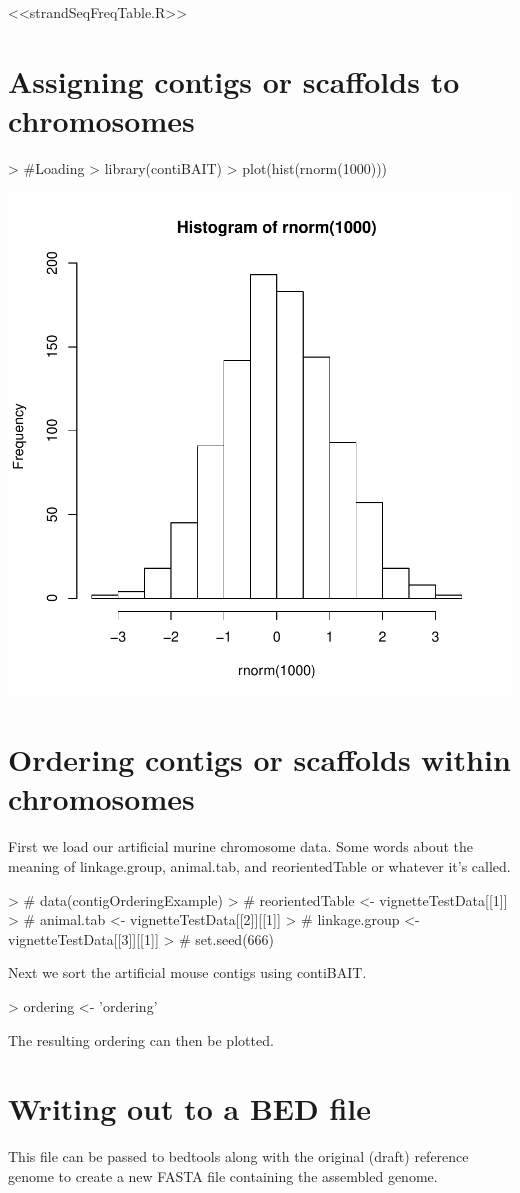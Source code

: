\documentclass{article}
\begin{document}
<<strandSeqFreqTable.R>>

\section{Assigning contigs or scaffolds to chromosomes}

\begin{Schunk}
\begin{Sinput}
> #Loading
> library(contiBAIT)
> plot(hist(rnorm(1000)))
\end{Sinput}
\end{Schunk}
\includegraphics{contiBAIT-examplea}


\section{Ordering contigs or scaffolds within chromosomes}
First we load our artificial murine chromosome data. Some words about the meaning of linkage.group, animal.tab, and reorientedTable or whatever it's called.
\begin{Schunk}
\begin{Sinput}
> #   data(contigOrderingExample)
> #   reorientedTable <-  vignetteTestData[[1]]
> #   animal.tab <- vignetteTestData[[2]][[1]]
> #   linkage.group <- vignetteTestData[[3]][[1]]
> #   set.seed(666)
\end{Sinput}
\end{Schunk}
Next we sort the artificial mouse contigs using contiBAIT.
\begin{Schunk}
\begin{Sinput}
>   ordering <- 'ordering'
\end{Sinput}
\end{Schunk}
The resulting ordering can then be plotted.

\section{Writing out to a BED file}
This file can be passed to bedtools along with the original (draft) reference genome to create a new FASTA file containing the assembled genome.
\end{document}

